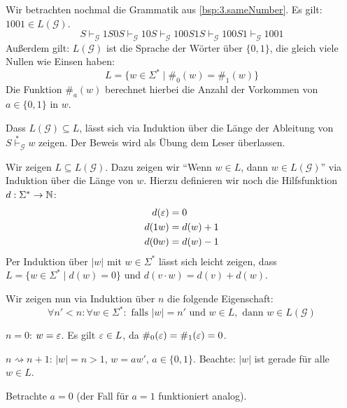 
\begin{Bsp}Wir betrachten nochmal die Grammatik aus \autoref{bsp:3.sameNumber}.
Es gilt: $1001\in L(\mathcal{G})$.
$$ S 
\vdash_\mathcal{G} 1S0S
\vdash_\mathcal{G} 10S
\vdash_\mathcal{G} 100S1S
\vdash_\mathcal{G} 100S1
\vdash_\mathcal{G} 1001
$$
Außerdem gilt: $L(\mathcal{G})$ ist die Sprache der Wörter über $\{0,1\}$, die gleich viele Nullen wie Einsen haben:
  \begin{displaymath}
    L = \{ w \in \Sigma^* \mid \#_0(w) = \#_1(w)\}
  \end{displaymath}
  Die Funktion $\#_a(w)$ berechnet hierbei die Anzahl der Vorkommen von $a \in \{0, 1\}$ in $w$.

  Dass $L(\mathcal{G}) \subseteq L$, lässt sich via Induktion über die Länge der Ableitung von $S \stackrel{*}{\vdash}_\mathcal{G} w$ zeigen.
  Der Beweis wird als Übung dem Leser überlassen.

  Wir zeigen $L \subseteq L(\mathcal{G})$.
  Dazu zeigen wir "`Wenn $w \in L$, dann $w \in L(\mathcal{G})$"' via Induktion über die Länge von $w$.
  Hierzu definieren wir noch die Hilfsfunktion $d : \Sigma^* \to \mathbb{N}$:
  \begin{align*}
    d(\varepsilon) &= 0 \\
    d(1w) &= d(w) + 1 \\
    d(0w) &= d(w) - 1
  \end{align*}
  Per Induktion über $|w|$ mit $w \in \Sigma^*$ lässt sich leicht zeigen, dass $L = \{w \in \Sigma^* \mid d(w) = 0\}$ und $d(v \cdot w) = d(v) + d(w)$.
  
Wir zeigen nun via Induktion über $n$ die folgende Eigenschaft:
$$\forall n' < n: \forall w \in \Sigma^*: \text{ falls } |w| = n' \text{ und } w \in L, \text{ dann } w \in L(\mathcal{G})$$

\begin{description}[font=\normalfont]
\item[I.A.:] $n = 0$: $w = \varepsilon$. Es gilt $\varepsilon \in L$, da $\#_0(\varepsilon) = \#_1(\varepsilon) = 0$.
\item[I.S.:] $n \rightsquigarrow n+1$: $|w| = n > 1$, $w = aw'$, $a \in \{0,1\}$.
  Beachte: $|w|$ ist gerade für alle $w \in L$.

  Betrachte $a = 0$ (der Fall für $a = 1$ funktioniert analog).


\end{description}
\end{Bsp}
